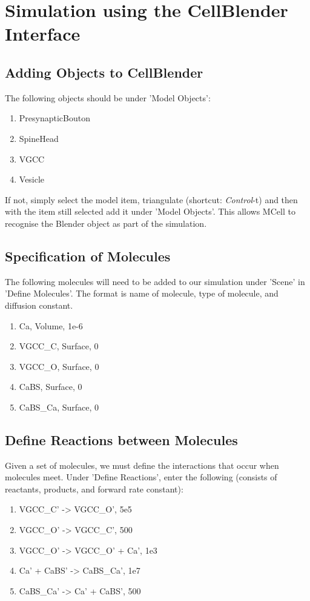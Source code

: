 \documentclass[twoside,a4paper]{refart}
\begin{document}
\section{Simulation using the CellBlender Interface}

\subsection{Adding Objects to CellBlender}
The following objects should be under 'Model Objects':

\begin{enumerate}
    \item PresynapticBouton
    \item SpineHead
    \item VGCC
    \item Vesicle
\end{enumerate}

If not, simply select the model item, triangulate (shortcut: \textit{Control}-t) and then with the item still selected add it under 'Model Objects'. This allows MCell to recognise the Blender object as part of the simulation.

\subsection{Specification of Molecules}
The following molecules will need to be added to our simulation under 'Scene' in 'Define Molecules'. The format is name of molecule, type of molecule, and diffusion constant.

\begin{enumerate}
    \item Ca, Volume, 1e-6
    \item VGCC\_C, Surface, 0
    \item VGCC\_O, Surface, 0
    \item CaBS, Surface, 0
    \item CaBS\_Ca, Surface, 0
\end{enumerate}

\subsection{Define Reactions between Molecules}
Given a set of molecules, we must define the interactions that occur when molecules meet. Under 'Define Reactions', enter the following (consists of reactants, products, and forward rate constant):

\begin{enumerate}
    \item VGCC\_C' -> VGCC\_O', 5e5
    \item VGCC\_O' -> VGCC\_C', 500
    \item VGCC\_O' -> VGCC\_O' + Ca', 1e3
    \item Ca' + CaBS' -> CaBS\_Ca', 1e7
    \item CaBS\_Ca' -> Ca' + CaBS', 500
\end{enumerate}
\end{document}
